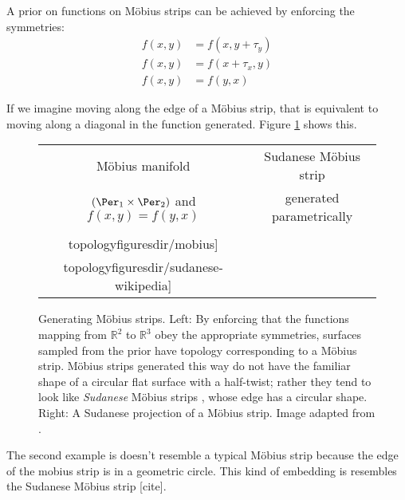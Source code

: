 A prior on functions on M\"{o}bius strips can be achieved by enforcing the symmetries:
%
\begin{align}
f(x, y) & = f( x, y + \tau_y) \\
f(x, y) & = f( x + \tau_x, y)  \\
f(x, y) & = f( y, x )
\end{align}

If we imagine moving along the edge of a M\"{o}bius strip, that is equivalent to moving along a diagonal in the function generated.
Figure \ref{fig:mobius} shows this.
%
\begin{figure}
\begin{tabular}[t]{c|c}
\centering
M\"{o}bius manifold & 
Sudanese M\"{o}bius strip \\
$( \Per_1 \times \Per_2 )$ and $f(x,y) = f(y,x)$ & generated parametrically\\
\texttt{[image: \\topologyfiguresdir/mobius]} &
\raisebox{1cm}{\texttt{[image: \\topologyfiguresdir/sudanese-wikipedia]}}
\end{tabular}
\caption[Generating M\"{o}bius strips]{Generating M\"{o}bius strips.
Left: By enforcing that the functions mapping from $\mathbb{R}^2$ to $\mathbb{R}^3$ obey the appropriate symmetries, surfaces sampled from the prior have topology corresponding to a M\"{o}bius strip.
M\"{o}bius strips generated this way do not have the familiar shape of a circular flat surface with a half-twist; rather they tend to look like \emph{Sudanese} M\"{o}bius strips \citep{sudanese1984}, whose edge has a circular shape.
Right: A Sudanese projection of a M\"{o}bius strip.
Image adapted from \citep{sudanesepict}.
}
\label{fig:mobius}
\end{figure}
%
The second example is doesn't resemble a typical M\"{o}bius strip because the edge of the mobius strip is in a geometric circle.  This kind of embedding is resembles the Sudanese M\"{o}bius strip [cite].

